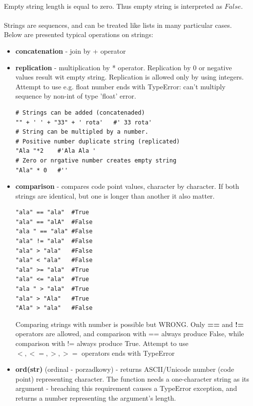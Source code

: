 \documentclass{article}
\begin{document}
	\paragraph{}
	Empty string length is equal to zero. Thus empty string is interpreted as $False$.
	\paragraph{}
	Strings are sequences, and can be treated like lists in many particular cases. Below are presented typical operations on strings:
\begin{itemize}
\item \textbf{concatenation} - join by + operator
\item \textbf{replication} - multiplication by * operator. Replication by 0 or negative values result wit empty string. Replication is allowed only by using integers. Attempt to use e.g. float number ends with \textcolor{pythonerror}{TypeError: can't multiply sequence by non-int of type 'float'} error.
	\begin{lstlisting}[style=pystyle]
# Strings can be added (concatenaded)
"" + ' ' + "33" + ' rota'	#' 33 rota'
# String can be multipled by a number.
# Positive number duplicate string (replicated)
"Ala "*2	#'Ala Ala '
# Zero or nrgative number creates empty string
"Ala" * 0	#''
	\end{lstlisting}
\item  \textbf{comparison} - compares code point values, character by character. If both strings are identical, but one is longer than another it also matter.
\begin{lstlisting}[style=pystyle]
"ala" == "ala"	#True
"ala" == "alA"	#False
"ala " == "ala"	#False
"ala" != "ala"	#False
"ala" > "ala"	#False
"ala" < "ala"	#False
"ala" >= "ala"	#True
"ala" <= "ala"	#True
"ala " > "ala"	#True
"ala" > "Ala"	#True
"Ala" > "ala"	#False
\end{lstlisting}
Comparing strings with number is possible but WRONG. Only \textbf{==} and \textbf{!=} operators are allowed, and comparison with == always produce False, while comparison with != always produce True. Attempt to use $<, <=, >, >=$ operators ends with \textcolor{pythonerror}{TypeError}
\item \textbf{ord(str)} (ordinal - porzadkowy) - returns ASCII/Unicode number (code point) representing character. The function needs a one-character string as its argument - breaching this requirement causes a \textcolor{pythonerror}{TypeError} exception, and returns a number representing the argument's length.	

\end{itemize}
\end{document}
